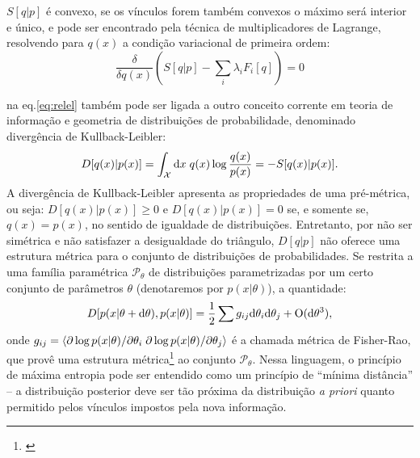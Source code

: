  $S[q | p]$ é convexo, se os vínculos forem também convexos o máximo será interior e único, e pode ser encontrado pela técnica de multiplicadores de Lagrange, resolvendo para $q(x)$ a condição variacional de primeira ordem:
\begin{equation}
\label{eq:entropymaximization}
\frac{\delta }{\delta q(x)}\left( S[q|p] - \sum_{i} \lambda_i F_i[q]\right) = 0
\end{equation}

 na eq.\eqref{eq:relel} também pode ser ligada a outro conceito corrente em teoria de informação e geometria de distribuições de probabilidade, denominado divergência de Kullback-Leibler\cite{Amari2000}:
\begin{equation}
\label{eq:kldiv}
 D[q(x) | p(x)] = \int_{\mathcal{X}} \ud x\; q(x) \log\frac{q(x)}{p(x)} = - S[q(x) | p(x)].
\end{equation}
A divergência de Kullback-Leibler apresenta as propriedades de uma pré-métrica, ou seja:  $D[q(x) | p(x)]\ge 0$ e $ D[q(x) | p(x)] = 0$ se, e somente se, $q(x) = p(x)$, no sentido de igualdade de distribuições. Entretanto, por não ser simétrica e não satisfazer a desigualdade do triângulo, $D[q|p]$ não oferece uma estrutura métrica para o conjunto de distribuições de probabilidades. Se restrita a uma família paramétrica  $\mathcal{P}_\theta$ de distribuições parametrizadas por um certo conjunto de parâmetros $\theta$ (denotaremos por $p(x|\theta)$), a quantidade:
\begin{equation}
 D[p(x|\theta+\mathrm{d}\theta), p(x|\theta)] = \frac{1}{2}\sum g_{ij} \mathrm{d}\theta_i \mathrm{d}\theta_j + \mathrm{O}(\mathrm{d}\theta^3),
\end{equation}
onde $g_{ij} = \left\langle \partial \log p(x|\theta)/ \partial \theta_i\;{\partial \log p(x|\theta) / \partial \theta_j} \right\rangle$ é a chamada métrica de Fisher-Rao, que provê uma estrutura métrica\footnote{\citet{Amari2000}} ao conjunto $\mathcal{P}_\theta$. Nessa linguagem, o princípio de máxima entropia pode ser entendido como um princípio de ``mínima distância'' -- a distribuição posterior deve ser tão próxima da distribuição \emph{a priori} quanto permitido pelos vínculos impostos pela nova informação.

